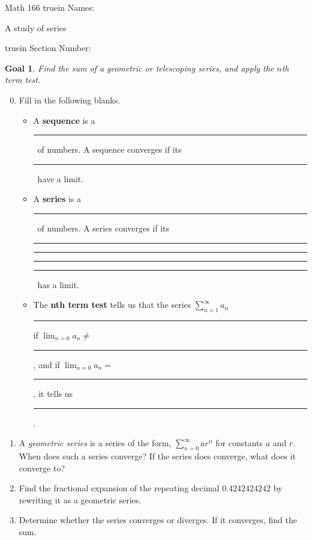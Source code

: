 \documentclass[12pt]{article}
\newtheorem*{goal}{Goal}
\begin{document}
\pagestyle{empty} %

\noindent
{Math 166 
  truein  Names:\ \hrulefill}

\noindent
{A study of series}

\noindent  {} truein  Section Number:\ \hrulefill
\medskip

\begin{goal} \rm
Find the sum of a geometric or telescoping series, and apply the $n$th term test.
\end{goal}

\begin{enumerate}
\setcounter{enumi}{-1}
\item Fill in the following blanks.
\begin{itemize}
\item A \textbf{sequence} is a~ \rule{.8in}{.4pt} ~of numbers.  A sequence converges if its~ \rule{.8in}{.4pt} ~have a limit.
\item A \textbf{series} is a~ \rule{.6in}{.4pt} ~of numbers. A series converges if its~ \rule{.8in}{.4pt} \rule{.2in}{.4pt} \rule{.8in}{.4pt} \rule{.5in}{.4pt} ~has a limit.
\item The {\bf nth term test} tells us that the series $\displaystyle \sum_{n = 1}^\infty a_n$ \rule{1in}{.4pt} if $\displaystyle \lim_{n = 0} a_n \neq$ \rule{.3in}{.4pt}, and if $\displaystyle \lim_{n = 0} a_n = $ \rule{.3in}{.4pt}, it tells us \rule{3in}{.4pt}.
\end{itemize}


\item A \emph{geometric series} is a series of the form, $\displaystyle \sum_{n = 0}^\infty ar^n$ for constants $a$ and $r$.  When does such a series converge?  If the series does converge, what does it converge to?
\vfill

\item Find the fractional expansion of the repeating decimal $0.42424242\overline{42}$ by rewriting it as a geometric series.

\vfill

\newpage

\item Determine whether the series converges or diverges. If it converges, find the sum.


\end{enumerate}
\end{document}
